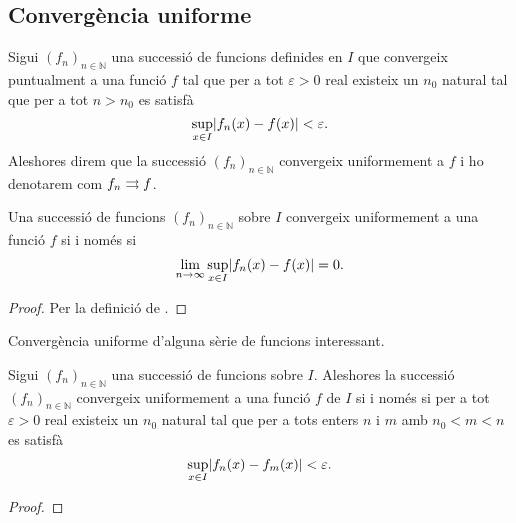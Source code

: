 \documentclass[../Apunts.tex]{subfiles}
\begin{document}
	\subsection{Convergència uniforme}
	\begin{definition}
		\label{def:convergència uniforme}
		Sigui \((f_{n})_{n\in\mathbb{N}}\) una successió de funcions definides en \(I\) que convergeix puntualment a una funció \(f\) tal que per a tot \(\varepsilon>0\) real existeix un \(n_{0}\) natural tal que per a tot \(n>n_{0}\) es satisfà
		\[\sup_{x\in I}\abs{f_{n}(x)-f(x)}<\varepsilon.\]
		Aleshores direm que la successió \((f_{n})_{n\in\mathbb{N}}\) convergeix uniformement a \(f\) i ho denotarem com \(f_{n}\rightrightarrows f\).
	\end{definition}
	\begin{observation}
		\label{obs:convergència uniforme amb límits}
		Una successió de funcions \((f_{n})_{n\in\mathbb{N}}\) sobre \(I\) convergeix uniformement a una funció \(f\) si i només si
		\[\lim_{n\to\infty}\sup_{x\in I}\abs{f_{n}(x)-f(x)}=0.\]
		\begin{proof}
			Per la definició de .
		\end{proof}
	\end{observation}
	\begin{example}
		Convergència uniforme d'alguna sèrie de funcions interessant. %
	\end{example}
	\begin{theorem}
		\label{thm:condició de Cauchy per successions de funcions}
		Sigui \((f_{n})_{n\in\mathbb{N}}\) una successió de funcions sobre \(I\). Aleshores la successió \((f_{n})_{n\in\mathbb{N}}\) convergeix uniformement a una funció \(f\) de \(I\) si i només si per a tot \(\varepsilon>0\) real existeix un \(n_{0}\) natural tal que per a tots enters \(n\) i \(m\) amb \(n_{0}<m<n\) es satisfà
		\[\sup_{x\in I}\abs{f_{n}(x)-f_{m}(x)}<\varepsilon.\]
		\begin{proof}
		\end{proof}
	\end{theorem}
\end{document}
